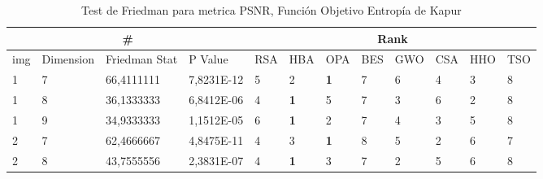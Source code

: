 \documentclass[conference]{IEEEtran}
\begin{document}
\begin{table}[]
	\centering
	\caption{Test de Friedman para metrica PSNR, Función Objetivo Entropía de Kapur}
	\begin{tabular}{|llll|llllllll|}
		\hline
		\multicolumn{4}{|c|}{\#} & \multicolumn{8}{c|}{Rank} \\ \hline
		\multicolumn{1}{|l|}{img} & \multicolumn{1}{l|}{Dimension} & \multicolumn{1}{l|}{Friedman Stat} & P Value    & \multicolumn{1}{l|}{RSA} & \multicolumn{1}{l|}{HBA}        & \multicolumn{1}{l|}{OPA}        & \multicolumn{1}{l|}{BES} & \multicolumn{1}{l|}{GWO}        & \multicolumn{1}{l|}{CSA}        & \multicolumn{1}{l|}{HHO}        & TSO                    \\ \hline 
		\multicolumn{1}{|l|}{1}   & \multicolumn{1}{l|}{7}         & \multicolumn{1}{l|}{66,4111111}    & 7,8231E-12 & \multicolumn{1}{l|}{5}   & \multicolumn{1}{l|}{2}          & \multicolumn{1}{l|}{\textbf{1}} & \multicolumn{1}{l|}{7}   & \multicolumn{1}{l|}{6}          & \multicolumn{1}{l|}{4}          & \multicolumn{1}{l|}{3}          & 8                      \\ \hline
		\multicolumn{1}{|l|}{1}   & \multicolumn{1}{l|}{8}         & \multicolumn{1}{l|}{36,1333333}    & 6,8412E-06 & \multicolumn{1}{l|}{4}   & \multicolumn{1}{l|}{\textbf{1}} & \multicolumn{1}{l|}{5}          & \multicolumn{1}{l|}{7}   & \multicolumn{1}{l|}{3}          & \multicolumn{1}{l|}{6}          & \multicolumn{1}{l|}{2}          & 8                      \\ \hline
		\multicolumn{1}{|l|}{1}   & \multicolumn{1}{l|}{9}         & \multicolumn{1}{l|}{34,9333333}    & 1,1512E-05 & \multicolumn{1}{l|}{6}   & \multicolumn{1}{l|}{\textbf{1}} & \multicolumn{1}{l|}{2}          & \multicolumn{1}{l|}{7}   & \multicolumn{1}{l|}{4}          & \multicolumn{1}{l|}{3}          & \multicolumn{1}{l|}{5}          & 8                      \\ \hline
		\multicolumn{1}{|l|}{2}   & \multicolumn{1}{l|}{7}         & \multicolumn{1}{l|}{62,4666667}    & 4,8475E-11 & \multicolumn{1}{l|}{4}   & \multicolumn{1}{l|}{3}          & \multicolumn{1}{l|}{\textbf{1}} & \multicolumn{1}{l|}{8}   & \multicolumn{1}{l|}{5}          & \multicolumn{1}{l|}{2}          & \multicolumn{1}{l|}{6}          & 7                      \\ \hline
		\multicolumn{1}{|l|}{2}   & \multicolumn{1}{l|}{8}         & \multicolumn{1}{l|}{43,7555556}    & 2,3831E-07 & \multicolumn{1}{l|}{4}   & \multicolumn{1}{l|}{\textbf{1}} & \multicolumn{1}{l|}{3}          & \multicolumn{1}{l|}{7}   & \multicolumn{1}{l|}{2}          & \multicolumn{1}{l|}{5}          & \multicolumn{1}{l|}{6}          & 8                      \\ \hline

\end{tabular}
\end{table}
\end{document}
